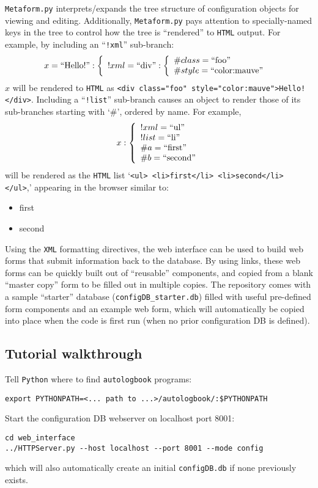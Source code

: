 \documentclass[12pt,english]{article}
\newcommand{\cd}[1]{\texttt{#1}}
\begin{document}
\cd{Metaform.py} interprets/expands the tree structure of configuration objects for viewing and editing.
Additionally, \cd{Metaform.py} pays attention to specially-named keys in the tree to control how the tree is ``rendered'' to \cd{HTML} output.
For example, by including an ``\cd{!xml}'' sub-branch:
\[ x = \textrm{``Hello!''}:  \left\{ \begin{array}{l} !xml = \textrm{``div''}: \left\{ \begin{array}{l} \#class = \textrm{``foo''} \\ \#style = \textrm{``color:mauve''}  \end{array} \right.  \end{array} \right.\]
$x$ will be rendered to \cd{HTML} as \verb#<div class="foo" style="color:mauve">Hello!</div>#.
Including a ``\cd{!list}'' sub-branch causes an object to render those of its sub-branches starting with `\#', ordered by name.
For example,
\[ x: \left\{ \begin{array}{l} !xml = \textrm{``ul''} \\ !list = \textrm{``li''} \\ \#a = \textrm{``first''} \\ \#b = \textrm{``second''}  \end{array} \right.\]
will be rendered as the \cd{HTML} list `\verb#<ul> <li>first</li> <li>second</li> </ul>#,' appearing in the browser similar to:
\begin{itemize}
\item first
\item second
\end{itemize}
Using the \cd{XML} formatting directives, the web interface can be used to build web forms that submit information back to the database.
By using links, these web forms can be quickly built out of ``reusable'' components,
	and copied from a blank ``master copy'' form to be filled out in multiple copies.
The repository comes with a sample ``starter'' database (\cd{configDB\_starter.db})
	filled with useful pre-defined form components and an example web form,
	which will automatically be copied into place when the code is first run (when no prior configuration DB is defined).

%
%
\subsection{Tutorial walkthrough}

Tell \cd{Python} where to find \cd{autologbook} programs:
\begin{verbatim}
export PYTHONPATH=<... path to ...>/autologbook/:$PYTHONPATH
\end{verbatim}
Start the configuration DB webserver on localhost port 8001:
\begin{verbatim}
cd web_interface
../HTTPServer.py --host localhost --port 8001 --mode config
\end{verbatim}
which will also automatically create an initial \cd{configDB.db} if none previously exists.
\end{document}
